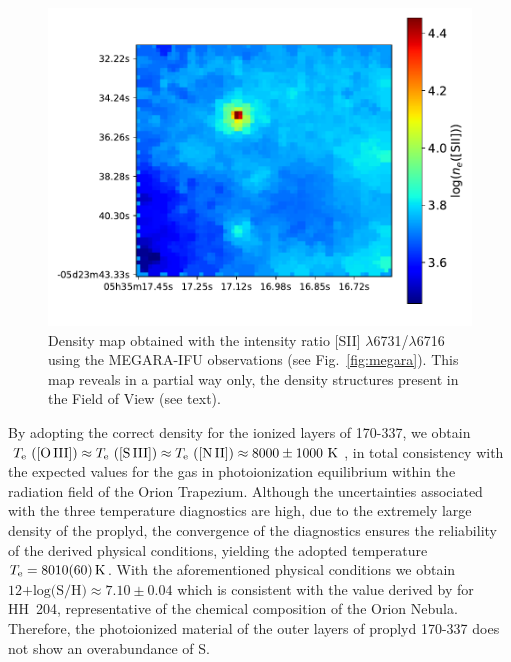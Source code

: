 \documentclass[fleqn,usenatbib]{mnras}
\newcommand{\eduardo}[1]{{\color{teal}E: #1}}
\newcommand{\jorge}[1]{{\color{magenta}J: #1}}
\begin{document}
\begin{figure}
\includegraphics[width=\columnwidth]{density_map.pdf}
\caption{Density map obtained with the intensity ratio [S\thinspace II] $\lambda$6731/$\lambda$6716 using the MEGARA-IFU observations (see Fig.~\ref{fig:megara}). This map reveals in a partial way only, the density structures present in the Field of View (see text).}
\label{fig:density_map}
\end{figure}


By adopting the correct density for the ionized layers of 170-337, we obtain $T_{\rm e} \text{ ([O\thinspace III])} \approx T_{\rm e} \text{ ([S\thinspace III])} \approx T_{\rm e} \text{ ([N\thinspace II])} \approx 8000 \pm 1000 \text{ K}$, in total consistency with the expected values for the gas in photoionization equilibrium within the radiation field of the Orion Trapezium. Although the uncertainties associated with the three temperature diagnostics are high, due to the extremely large density of the proplyd, the convergence of the diagnostics ensures the reliability of the derived physical conditions, yielding the adopted temperature $T_{\rm e}=\SI{8010 \pm 60}{K}$. With the aforementioned physical conditions we obtain $\text{12+log(S/H)} \approx 7.10 \pm 0.04 $ which is consistent with the value derived by \citet{mendez2021-2} for HH~204, representative of the chemical composition of the Orion Nebula. Therefore, the photoionized material of the outer layers of proplyd 170-337 does not show an overabundance of S.


\end{document}

